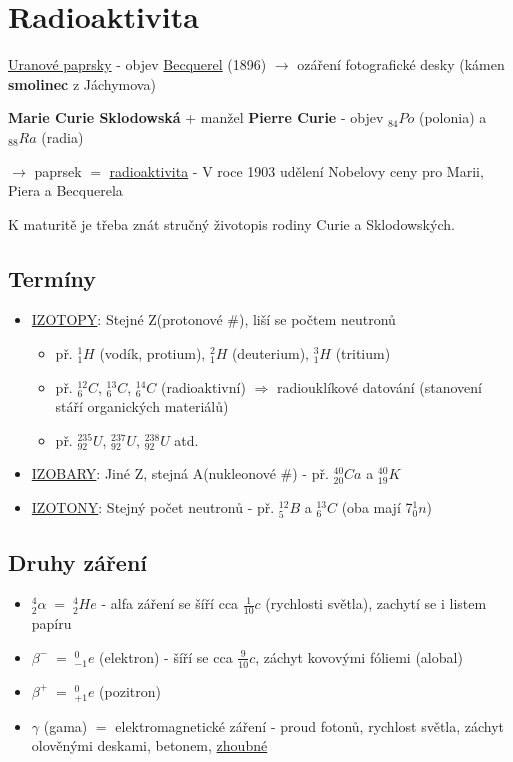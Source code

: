 \section{Radioaktivita}
\underline{Uranové paprsky} - objev \underline{Becquerel} (1896)
$\rightarrow$ ozáření fotografické desky (kámen \textbf{smolinec} z Jáchymova)

\vspace{1em}

\textbf{Marie Curie Sklodowská} + manžel \textbf{Pierre Curie} - objev $_{84}Po$ (polonia) a $_{88}Ra$ (radia)

$\rightarrow$ paprsek $=$ \underline{radioaktivita} - V roce 1903 udělení Nobelovy ceny pro Marii, Piera a Becquerela

K maturitě je třeba znát stručný životopis rodiny Curie a Sklodowských.

\subsection{Termíny}

\begin{itemize}
    \item \underline{IZOTOPY}: Stejné Z(protonové \#), liší se počtem neutronů \begin{itemize}
        \item př. $^1_1H$ (vodík, protium), $^2_1H$ (deuterium), $^3_1H$ (tritium)
        \item př. $^{12}_6C$, $^{13}_6C$, $^{14}_6C$ (radioaktivní) $\Rightarrow$ radiouklíkové datování (stanovení stáří organických materiálů)
        \item př. $^{235}_{92}U$, $^{237}_{92}U$, $^{238}_{92}U$ atd.
        \end{itemize}
    \item \underline{IZOBARY}: Jiné Z, stejná A(nukleonové \#) - př. $^{40}_{20}Ca$ a $^{40}_{19}K$
    \item \underline{IZOTONY}: Stejný počet neutronů - př. $^{12}_5B$ a $^{13}_6C$ (oba mají 7$^1_0n$)
\end{itemize}

\subsection{Druhy záření}
    \begin{itemize}
        \item $^4_2\alpha \; = \; ^4_2He$ - alfa záření se šíří cca $\frac{1}{10}c$ (rychlosti světla), zachytí se i listem papíru
        \item $\beta^{-} \; = \; ^0_{-1}e$ (elektron) - šíří se cca $\frac{9}{10}c$, záchyt kovovými fóliemi (alobal)
        \item $\beta^{+} \; = \; ^0_{+1}e$ (pozitron)
        \item $\gamma$ (gama) $=$ elektromagnetické záření - proud fotonů, rychlost světla, záchyt olověnými deskami, betonem, \underline{zhoubné}
    \end{itemize}

